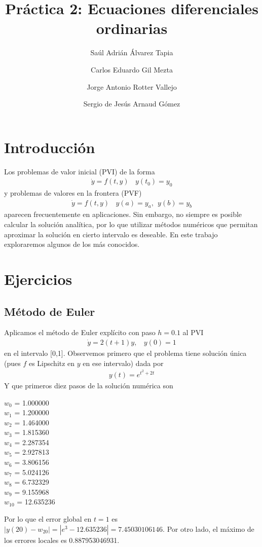 \documentclass[11pt]{article}
\begin{document}
\author{Saúl Adrián Álvarez Tapia \and Carlos Eduardo Gil Mezta \and Jorge Antonio Rotter Vallejo \and Sergio de Jesús Arnaud Gómez}

\title{\Huge Práctica 2: Ecuaciones diferenciales ordinarias}
\date{}
\maketitle

\noindent
\section{Introducción}
Los problemas de valor inicial (PVI) de la forma
\begin{align*}
\dot{y} = f(t,y) \ \ \ \ y(t_0) = y_0
\end{align*}
y problemas de valores en la frontera (PVF)
\begin{align*}
\dot{y} = f(t,y) \ \ \ \ y(a) = y_a, \ \ y(b) = y_b
\end{align*}
aparecen frecuentemente en aplicaciones. Sin embargo, no siempre es posible calcular
la solución analítica, por lo que utilizar métodos numéricos que permitan aproximar
la solución en cierto intervalo es deseable. En este trabajo exploraremos algunos de
los más conocidos.



\section{Ejercicios}
\subsection{Método de Euler}
Aplicamos el método de Euler explícito con paso $h = 0.1$ al PVI
\begin{align}
\dot{y} = 2(t+1)y, \ \ \ \ y(0) = 1
\end{align}
en el intervalo [0,1]. Observemos primero que el problema tiene solución única (pues
$f$ es Lipschitz en $y$ en ese intervalo) dada por
\begin{align}
y(t) = e^{t^2+2t}
\end{align}
Y que primeros diez pasos de la solución numérica son
\begin{multicols}{3}
\noindent
$w_0$ = 1.000000\\
$w_1$ = 1.200000 \\
$w_2$ = 1.464000 \\
$w_3$ = 1.815360 \\
$w_4$ = 2.287354 \\
$w_5$ = 2.927813 \\
$w_6$ = 3.806156 \\
$w_7$ = 5.024126 \\
$w_8$ = 6.732329 \\
$w_9$ = 9.155968 \\
$w_{10}$ = 12.635236
\end{multicols}
\noindent
Por lo que el error global en $t=1$ es $|y(20)-w_{20}| = |e^3 - 12.635236| = 
7.45030106146.$ Por otro lado, el máximo de los errores locales es 0.887953046931. 
\end{document}
